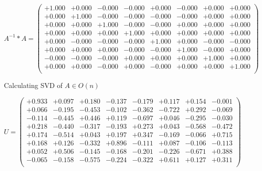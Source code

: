 \documentclass[9pt]{article}
\theoremstyle{plain}
\theoremstyle{definition}
\theoremstyle{remark}
\numberwithin{equation}{section}
\begin{document}
$A^{-1} *A = \left(
\begin{array}{
cccccccc}
+1.000 & +0.000 & -0.000 & -0.000 & +0.000 & -0.000 & +0.000 & +0.000 \\
+0.000 & +1.000 & -0.000 & -0.000 & -0.000 & -0.000 & +0.000 & +0.000 \\
+0.000 & +0.000 & +1.000 & -0.000 & -0.000 & +0.000 & +0.000 & +0.000 \\
+0.000 & +0.000 & +0.000 & +1.000 & +0.000 & +0.000 & +0.000 & +0.000 \\
+0.000 & -0.000 & -0.000 & -0.000 & +1.000 & +0.000 & -0.000 & -0.000 \\
+0.000 & +0.000 & +0.000 & -0.000 & -0.000 & +1.000 & -0.000 & +0.000 \\
-0.000 & -0.000 & -0.000 & +0.000 & +0.000 & +0.000 & +1.000 & +0.000 \\
+0.000 & +0.000 & -0.000 & +0.000 & -0.000 & +0.000 & +0.000 & +1.000 \\
\end{array}
\right)$ \newline 

Calculating SVD of  $A \in O(n)$

$U = \left(
\begin{array}{
cccccccc}
+0.933 & +0.097 & +0.180 & -0.137 & -0.179 & +0.117 & +0.154 & -0.001 \\
+0.066 & -0.195 & -0.453 & -0.102 & -0.362 & -0.722 & +0.292 & -0.069 \\
-0.114 & -0.445 & +0.446 & +0.119 & -0.697 & +0.046 & -0.295 & -0.030 \\
+0.218 & -0.440 & -0.317 & -0.193 & +0.273 & +0.043 & -0.568 & -0.472 \\
+0.174 & -0.514 & +0.043 & +0.197 & +0.347 & -0.169 & -0.066 & +0.715 \\
+0.168 & +0.126 & -0.332 & +0.896 & -0.111 & +0.087 & -0.106 & -0.113 \\
+0.052 & +0.506 & -0.145 & -0.168 & -0.201 & -0.226 & -0.671 & +0.388 \\
-0.065 & -0.158 & -0.575 & -0.224 & -0.322 & +0.611 & +0.127 & +0.311 \\
\end{array}
\right)$ \newline 
\end{document}
